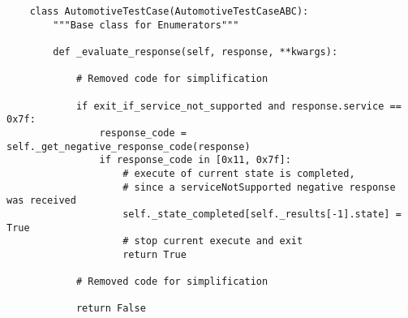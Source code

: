 \begin{samepage}
\begin{verbatim}
    class AutomotiveTestCase(AutomotiveTestCaseABC):
        """Base class for Enumerators"""

        def _evaluate_response(self, response, **kwargs):

            # Removed code for simplification

            if exit_if_service_not_supported and response.service == 0x7f:
                response_code = self._get_negative_response_code(response)
                if response_code in [0x11, 0x7f]:
                    # execute of current state is completed,
                    # since a serviceNotSupported negative response was received
                    self._state_completed[self._results[-1].state] = True
                    # stop current execute and exit
                    return True

            # Removed code for simplification

            return False
\end{verbatim}
\end{samepage}    
